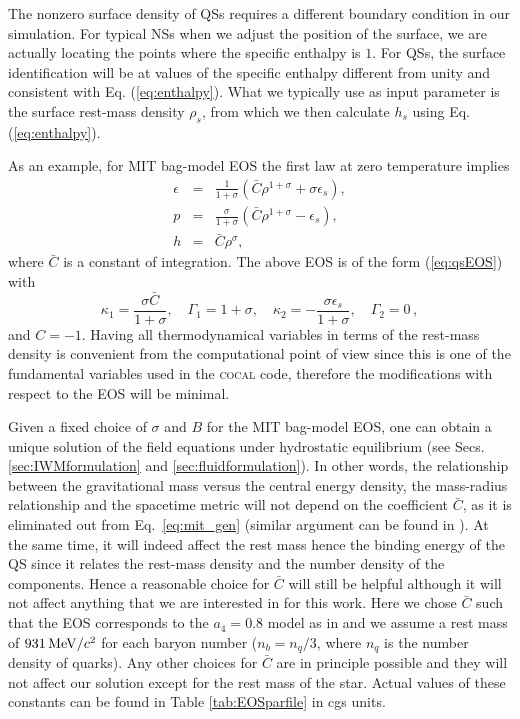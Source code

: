 \documentclass[twocolumn,superscriptaddress,showpacs,prd,aps,amsmath,amssymb,nofootinbib]{revtex4-1}
\newcommand{\cocal}{\textsc{cocal}}
\begin{document}
The nonzero surface density of QSs requires a different boundary
condition in our simulation. For typical NSs when we adjust the position
of the surface, we are actually locating the points where the specific
enthalpy is $1$. For QSs, the surface identification will be at values of
the specific enthalpy different from unity and
consistent with Eq. (\ref{eq:enthalpy}). What we
typically use as input parameter is the surface rest-mass density
$\rho_s$, from which we then calculate $h_s$ using
Eq. (\ref{eq:enthalpy}).

As an example, for MIT bag-model EOS the first law at zero temperature
implies
\begin{eqnarray}
\epsilon & = & \frac{1}{1+\sigma}\left( \bar{C} \rho^{1+\sigma} + \sigma \epsilon_s \right) , \label{eq:mit_gen_eps} \\
p & = & \frac{\sigma}{1+\sigma}\left( \bar{C} \rho^{1+\sigma} -\epsilon_s \right) , \label{eq:mit_gen_p} \\
h & = & \bar{C} \rho^\sigma,
\end{eqnarray}
where $\bar{C}$ is a constant of integration. The above EOS is of the
form (\ref{eq:qsEOS}) with
\begin{equation}
\kappa_1 = \frac{\sigma \bar{C}}{1+\sigma},\quad \Gamma_1 = 1+\sigma,\quad 
    \kappa_2 =-\frac{\sigma \epsilon_s}{1+\sigma},\quad \Gamma_2 = 0\,, 
\end{equation}
%
and $C=-1$. Having all thermodynamical variables in terms of the
rest-mass density is convenient from the computational point of view since
this is one of the fundamental variables used in the \cocal{} code,
therefore the modifications with respect to the EOS will be minimal.

Given a fixed choice of $\sigma$ and $B$ for the MIT bag-model
EOS, one can obtain a unique solution of the field
equations under hydrostatic equilibrium (see Secs.
\ref{sec:IWMformulation} and \ref{sec:fluidformulation}). In other words,
the relationship between the gravitational mass versus the central energy
density, the mass-radius relationship and the spacetime metric will not
depend on the coefficient $\bar{C}$, as it is eliminated out from
Eq.~\eqref{eq:mit_gen} (similar argument can be found in
\cite{Li2017,Bhattacharyya2016}). At the same time, it will indeed affect
the rest mass hence the binding energy of the QS since
it relates the rest-mass density and the number density of the
components. Hence a reasonable choice for $\bar{C}$ will still be helpful
although it will not affect anything that we are interested in for this
work. Here we chose $\bar{C}$ such that the EOS corresponds to the $a_4 =
0.8$ model as in \cite{Alford2005} and we assume a rest mass of
$931\,{\rm MeV}/c^2$ for each baryon number ($n_b=n_q/3$, where $n_q$ is
the number density of quarks). Any other choices for $\bar{C}$ are in
principle possible and they will not affect our solution except for the
rest mass of the star. Actual values of these constants can be found in
Table \ref{tab:EOSparfile} in cgs units.
\end{document}
